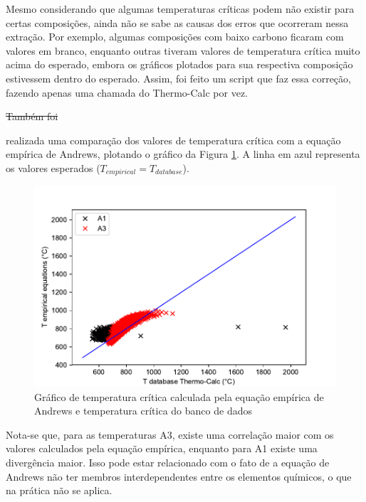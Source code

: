 \documentclass[brazil,tf,epusp]{usp}  %
\providecommand{\DIFadd}[1]{{\protect\color{blue}\uwave{#1}}} %
\providecommand{\DIFdel}[1]{{\protect\color{red}\sout{#1}}}                      %
\providecommand{\DIFaddbegin}{} %
\providecommand{\DIFaddend}{} %
\providecommand{\DIFdelbegin}{} %
\providecommand{\DIFdelend}{} %
\begin{document}
Mesmo considerando que algumas temperaturas críticas podem não existir para certas composições, ainda não se sabe as causas dos erros que ocorreram nessa extração. Por exemplo, algumas composições com baixo carbono ficaram com valores em branco, enquanto outras tiveram valores de temperatura crítica muito acima do esperado, embora os gráficos plotados para sua respectiva composição estivessem dentro do esperado. Assim, foi feito um script que faz essa correção, fazendo apenas uma chamada do Thermo-Calc\textregistered{} por vez.

\DIFdelbegin \DIFdel{Também foi }\DIFdelend %
\DIFaddbegin 

\DIFadd{Foi }\DIFaddend realizada uma comparação dos valores de temperatura crítica com a equação empírica de Andrews, plotando o gráfico da Figura \ref{fig:tcrit_andrews}. A linha em azul representa os valores esperados ($T_{empirical} = T_{database}$).

\begin{figure}
  \includegraphics[width=1.1\textwidth]{img/andrews.pdf}
  \caption{Gráfico de temperatura crítica calculada pela equação empírica de Andrews e temperatura crítica do banco de dados}
  \label{fig:tcrit_andrews}
\end{figure}

Nota-se que, para as temperaturas A3, existe uma correlação maior com os valores calculados pela equação empírica, enquanto para A1 existe uma divergência maior. Isso pode estar relacionado com o fato de a equação de Andrews não ter membros interdependentes entre os elementos químicos, o que na prática não se aplica.
\end{document}
